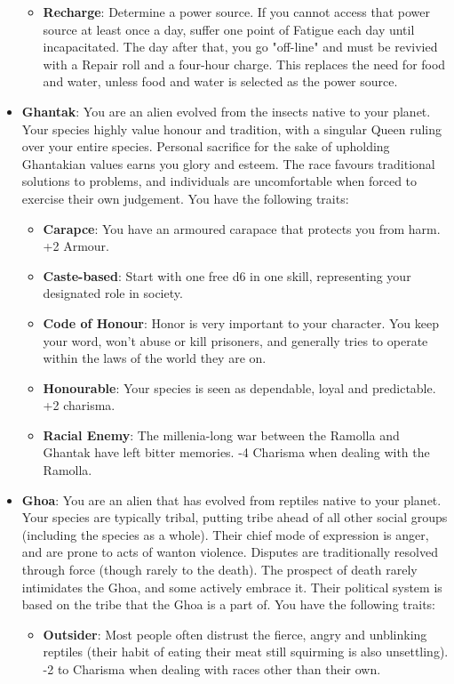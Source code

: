 \documentclass[10pt,twoside]{article}
\begin{document}
\begin{multicols}{2}
\begin{itemize}
\begin{itemize}
    \item \textbf{Recharge}: Determine a power source. If you cannot access that power source at least once a day, suffer one point of Fatigue each day until incapacitated. The day after that, you go "off-line" and must be revivied with a Repair roll and a four-hour charge. This replaces the need for food and water, unless food and water is selected as the power source.
\end{itemize}

\item \textbf{Ghantak}: You are an alien evolved from the insects native to your planet. Your species highly value honour and tradition, with a singular Queen ruling over your entire species. Personal sacrifice for the sake of upholding Ghantakian values earns you glory and esteem. The race favours traditional solutions to problems, and individuals are uncomfortable when forced to exercise their own judgement. You have the following traits:
\begin{itemize}
    \item \textbf{Carapce}: You have an armoured carapace that protects you from harm. +2 Armour.

    \item \textbf{Caste-based}: Start with one free d6 in one skill, representing your designated role in society.

    \item \textbf{Code of Honour}: Honor is very important to your character. You keep your word, won't abuse or kill prisoners, and generally tries to operate within the laws of the world they are on.

    \item \textbf{Honourable}: Your species is seen as dependable, loyal and predictable. +2 charisma.

    \item \textbf{Racial Enemy}: The millenia-long war between the Ramolla and Ghantak have left bitter memories. -4 Charisma when dealing with the Ramolla.
\end{itemize}

\item \textbf{Ghoa}: You are an alien that has evolved from reptiles native to your planet. Your species are typically tribal, putting tribe ahead of all other social groups (including the species as a whole). Their chief mode of expression is anger, and are prone to acts of wanton violence. Disputes are traditionally resolved through force (though rarely to the death). The prospect of death rarely intimidates the Ghoa, and some actively embrace it. Their political system is based on the tribe that the Ghoa is a part of. You have the following traits:
\begin{itemize}
    \item \textbf{Outsider}: Most people often distrust the fierce, angry and unblinking reptiles (their habit of eating their meat still squirming is also unsettling). -2 to Charisma when dealing with races other than their own.


\end{itemize}
\end{itemize}
\end{multicols}
\end{document}
